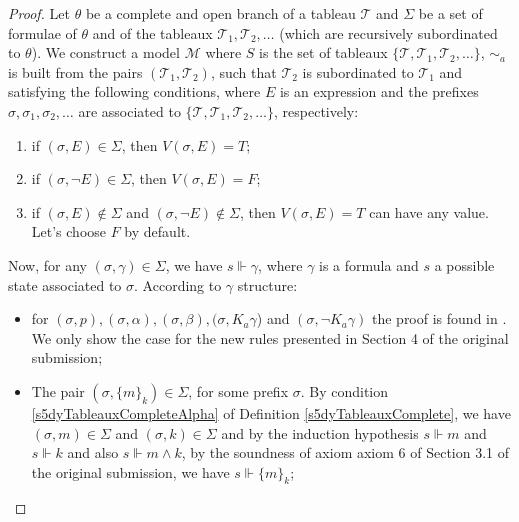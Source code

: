 \documentclass[submission,copyright,creativecommons]{eptcs}
\begin{document}
        \begin{proof}
            Let $\theta$ be a complete and open branch of a tableau $\mathscr{T}$ and $\Sigma$ be a set of formulae of $\theta$ and of the tableaux $\mathscr{T}_1, \mathscr{T}_2, \dots$ (which are recursively subordinated to $\theta$). We construct a model $\mathscr{M}$ where $S$ is the set of tableaux $\{\mathscr{T}, \mathscr{T}_1, \mathscr{T}_2, \dots\}$, $\sim_{a}$ is built from the pairs $(\mathscr{T}_1, \mathscr{T}_2)$, such that $\mathscr{T}_2$ is subordinated to $\mathscr{T}_1$ and satisfying the following conditions, where $E$ is an expression and the prefixes $\sigma, \sigma_1, \sigma_2, \dots$ are associated to $\{\mathscr{T}, \mathscr{T}_1, \mathscr{T}_2, \dots\}$, respectively:
        
            \begin{enumerate}
                \item if $(\sigma, E) \in \Sigma$, then $V(\sigma, E) = T$;
                \item if $(\sigma, \neg E) \in \Sigma$, then $V(\sigma, E) = F$;
                \item if $(\sigma, E) \not \in \Sigma$ and $(\sigma, \neg E) \not \in \Sigma$, then $V(\sigma, E) = T$ can have any value. Let's choose $F$ by default.
            \end{enumerate}
        
            Now, for any $(\sigma, \gamma) \in \Sigma$, we have $s \Vdash \gamma$, where $\gamma$ is a formula and $s$ a possible state associated to $\sigma$. According to $\gamma$ structure:
        
            \begin{itemize}
                \item for $(\sigma, p), (\sigma, \alpha), (\sigma, \beta), (\sigma, K_a \gamma$) and $(\sigma, \neg K_a \gamma)$ the proof is found in \cite{IntroducaoLogicaModalAplicadaComputacao}. We only show the case for the new rules presented in Section 4 of the original submission;
                
                \item The pair $(\sigma, \{m\}_k) \in \Sigma$, for some prefix $\sigma$. By condition \ref{s5dyTableauxCompleteAlpha} of Definition \ref{s5dyTableauxComplete}, we have $(\sigma, m) \in \Sigma$ and $(\sigma,k) \in \Sigma$ and by the induction hypothesis $s \Vdash m$ and $s \Vdash k$ and also $s \Vdash m \land k$, by the soundness of axiom axiom 6 of Section 3.1 of the original submission, we have $s \Vdash \{m\}_k$;
                

\end{itemize}
\end{proof}
\end{document}
